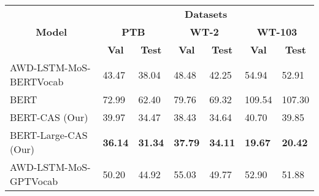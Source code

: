 \documentclass[11pt,a4paper]{article}
\begin{document}
\begin{table*}[t!]
\centering
\begin{tabular}{|l|l|l|l|l|l|l|}
\hline
\multicolumn{1}{|c|}{\multirow{3}{*}{\textbf{Model}}} & \multicolumn{6}{c|}{\textbf{Datasets}}                                                                                                                                                                                   \\ \cline{2-7} 
\multicolumn{1}{|c|}{}                                & \multicolumn{2}{c|}{\textbf{PTB}}                                      & \multicolumn{2}{c|}{\textbf{WT-2}}                                     & \multicolumn{2}{c|}{\textbf{WT-103}}                                   \\ \cline{2-7} 
\multicolumn{1}{|c|}{}                                & \multicolumn{1}{c|}{\textbf{Val}} & \multicolumn{1}{c|}{\textbf{Test}} & \multicolumn{1}{c|}{\textbf{Val}} & \multicolumn{1}{c|}{\textbf{Test}} & \multicolumn{1}{c|}{\textbf{Val}} & \multicolumn{1}{c|}{\textbf{Test}} \\ \hline
AWD-LSTM-MoS-BERTVocab                                & 43.47                             & 38.04                              & 48.48                             & 42.25                              & 54.94                             & 52.91                              \\ \hline
BERT                                      & 72.99                             & 62.40                              & 79.76                             & 69.32                              & 109.54                            & 107.30                             \\ \hline
BERT-CAS (Our)                          & 39.97                    & 34.47                     & 38.43                    & 34.64                     & 40.70                   & 39.85                     \\ \hline 
BERT-Large-CAS (Our)                          & \textbf{36.14}                    & \textbf{31.34}                     & \textbf{37.79}                    & \textbf{34.11}                     & \textbf{19.67}                    & \textbf{20.42}                     \\ \hline
\hline
AWD-LSTM-MoS-GPTVocab                                 & 50.20                             & 44.92                              & 55.03                             & 49.77                              & 52.90                             & 51.88                              \\ \hline

\end{tabular}
\end{table*}
\end{document}
